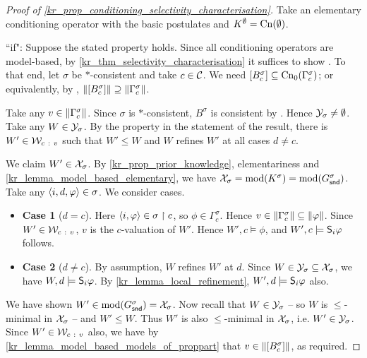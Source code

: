 \begin{proof}[Proof of \cref{kr_prop_conditioning_selectivity_characterisation}]
    Take an elementary conditioning operator with the basic postulates
    and $K^\emptyset = \cn(\emptyset)$.

    ``if":  Suppose the stated property holds. Since all conditioning operators
    are model-based, by \cref{kr_thm_selectivity_characterisation} it suffices to
    show \boundedness{}. To that end, let $\sigma$ be $\ast$-consistent and
    take $c \in \C$. We need $\proppart{B^\sigma_c} \subseteq
    \cnprop(\Gamma^\sigma_c)$; or equivalently, by \closure{},
    $\propmods{\proppart{B^\sigma_c}} \supseteq \propmods{\Gamma^\sigma_c}$.

    Take any $v \in \propmods{\Gamma^\sigma_c}$. Since $\sigma$ is
    $\ast$-consistent, $B^\sigma$ is consistent by \consistency{}. Hence
    $\Y_\sigma \ne \emptyset$. Take any $W \in \Y_\sigma$. By the property in
    the statement of the result, there is $W' \in \W_{c\ :\ v}$ such that $W'
    \le W$ and $W$ refines $W'$ at all cases $d \ne c$.

    We claim $W' \in \X_\sigma$. By \cref{kr_prop_prior_knowledge}, elementariness
    and \cref{kr_lemma_model_based_elementary}, we have $\X_\sigma =
    \mods(K^\sigma) = \mods(G^\sigma_\snd)$. Take any $\tuple{i, d, \phi} \in
    \sigma$. We consider cases.
    \begin{itemize}
        \item \textbf{Case 1} ($d = c$). Here $\tuple{i, \phi} \in \sigma \rs
            c$, so $\phi \in \Gamma^\sigma_c$. Hence $v \in
            \propmods{\Gamma^\sigma_c} \subseteq \propmods{\phi}$. Since $W'
            \in \W_{c\ :\ v}$, $v$ is the $c$-valuation of $W'$. Hence $W', c
            \models \phi$, and $W', c \models \S_i\phi$ follows.

        \item \textbf{Case 2} ($d \ne c$). By assumption, $W$ refines $W'$ at
              $d$. Since $W \in \Y_\sigma \subseteq \X_\sigma$, we have $W, d
              \models \S_i\phi$. By \cref{kr_lemma_local_refinement}, $W', d
              \models \S_i\phi$ also.
    \end{itemize}
    We have shown $W' \in \mods(G^\sigma_\snd) = \X_\sigma$. Now recall that $W
    \in \Y_\sigma$ -- so $W$ is $\le$-minimal in $\X_\sigma$ -- and $W' \le W$.
    Thus $W'$ is also $\le$-minimal in $\X_\sigma$, i.e. $W' \in \Y_\sigma$.
    Since $W' \in \W_{c\ :\ v}$ also, we have by
    \cref{kr_lemma_model_based_models_of_proppart} that $v \in
    \propmods{\proppart{B^\sigma_c}}$, as required.


\end{proof}
